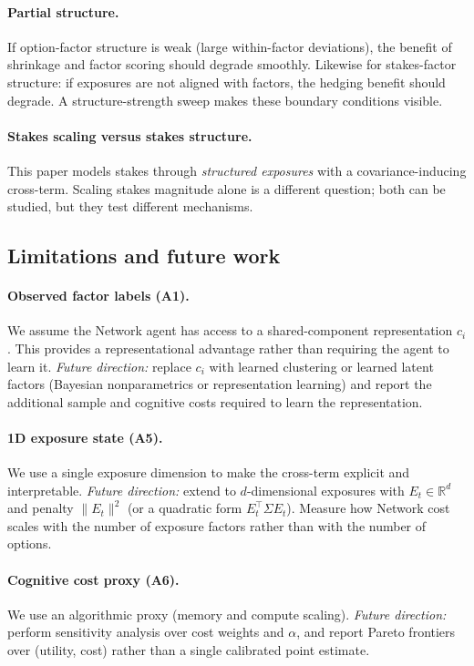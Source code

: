 \documentclass[11pt]{article}
\begin{document}
\paragraph{Partial structure.}
If option-factor structure is weak (large within-factor deviations), the benefit of shrinkage and factor scoring should degrade smoothly. Likewise for stakes-factor structure: if exposures are not aligned with factors, the hedging benefit should degrade. A structure-strength sweep makes these boundary conditions visible.

\paragraph{Stakes scaling versus stakes structure.}
This paper models stakes through \emph{structured exposures} with a covariance-inducing cross-term. Scaling stakes magnitude alone is a different question; both can be studied, but they test different mechanisms.

\subsection{Limitations and future work}

\paragraph{Observed factor labels (A1).}
We assume the Network agent has access to a shared-component representation $c_i$. This provides a representational advantage rather than requiring the agent to learn it.
\emph{Future direction:} replace $c_i$ with learned clustering or learned latent factors (Bayesian nonparametrics or representation learning) and report the additional sample and cognitive costs required to learn the representation.

\paragraph{1D exposure state (A5).}
We use a single exposure dimension to make the cross-term explicit and interpretable.
\emph{Future direction:} extend to $d$-dimensional exposures with $E_t\in\mathbb{R}^d$ and penalty $\|E_t\|^2$ (or a quadratic form $E_t^\top \Sigma E_t$). Measure how Network cost scales with the number of exposure factors rather than with the number of options.

\paragraph{Cognitive cost proxy (A6).}
We use an algorithmic proxy (memory and compute scaling).
\emph{Future direction:} perform sensitivity analysis over cost weights and $\alpha$, and report Pareto frontiers over (utility, cost) rather than a single calibrated point estimate.
\end{document}
